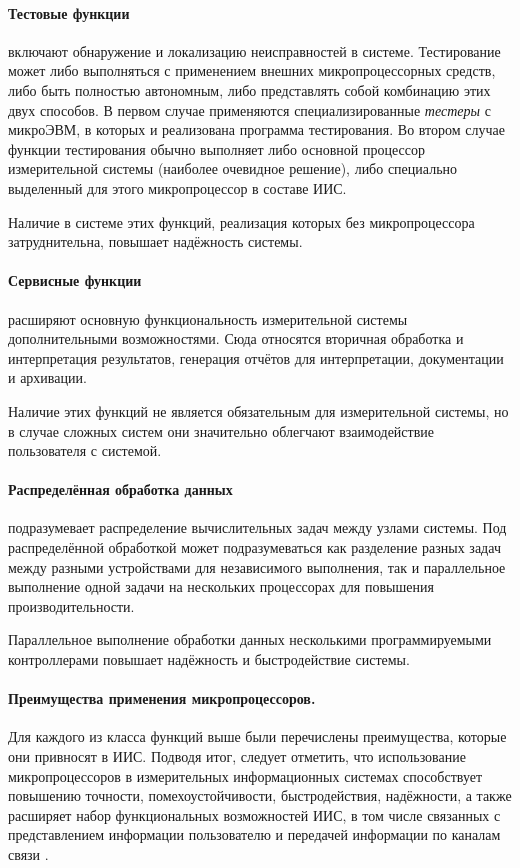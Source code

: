 \documentclass[a4paper, 14pt, titlepage]{extarticle}
\newcommand{\term}[1]{\emph{#1}}
\begin{document}
  \paragraph{Тестовые функции} включают обнаружение и локализацию неисправностей в системе.
  Тестирование может либо выполняться с применением внешних микропроцессорных средств, либо быть
  полностью автономным, либо представлять собой комбинацию этих двух способов. В первом случае
  применяются специализированные \term{тестеры} с микроЭВМ, в которых и реализована программа
  тестирования. Во втором случае функции тестирования обычно выполняет либо основной процессор
  измерительной системы (наиболее очевидное решение), либо специально выделенный для этого
  микропроцессор в составе ИИС.

  Наличие в системе этих функций, реализация которых без микропроцессора затруднительна,
  повышает надёжность системы.

  \paragraph{Сервисные функции} расширяют основную функциональность измерительной системы
  дополнительными возможностями. Сюда относятся вторичная обработка и интерпретация результатов,
  генерация отчётов для интерпретации, документации и архивации.

  Наличие этих функций не является обязательным для измерительной системы, но в случае сложных
  систем они значительно облегчают взаимодействие пользователя с системой.

  \paragraph{Распределённая обработка данных} подразумевает распределение вычислительных задач между
  узлами системы. Под распределённой обработкой может подразумеваться как разделение разных задач
  между разными устройствами для независимого выполнения, так и параллельное выполнение одной задачи
  на нескольких процессорах для повышения производительности.

  Параллельное выполнение обработки данных несколькими программируемыми
  контроллерами повышает надёжность и быстродействие системы.

  \paragraph{Преимущества применения микропроцессоров.}
  Для каждого из класса функций выше были перечислены преимущества, которые они привносят в ИИС.
  Подводя итог, следует отметить, что использование микропроцессоров в измерительных информационных системах способствует
  повышению точности, помехоустойчивости, быстродействия, надёжности, а также расширяет набор
  функциональных возможностей ИИС, в том числе связанных с представлением информации пользователю
  и передачей информации по каналам связи \cite{klaassen-methods}.
\end{document}
